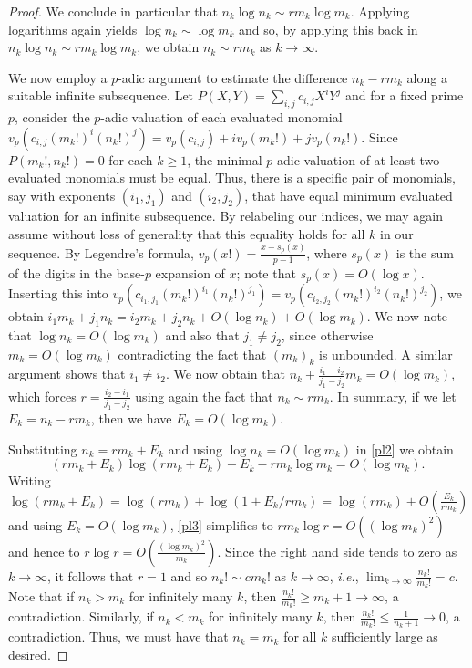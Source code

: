 \documentclass[11pt,reqno]{amsart}
\theoremstyle{definition}
\numberwithin{equation}{section}
\begin{document}
\begin{proof}
We conclude in particular that $n_k \log n_k \sim r m_k \log m_k$. Applying logarithms again yields $\log n_k \sim \log m_k$ and so, by applying this back in $n_k \log n_k \sim r m_k \log m_k$, we obtain  $n_k \sim r m_k$ as $k \to \infty$.     

We now employ a $p$-adic argument to estimate the difference $n_k - r m_k$ along a suitable infinite subsequence. 
Let $P(X, Y)=\sum_{i, j} c_{i, j} X^i Y^j$ and for a fixed prime $p$, consider the $p$-adic valuation of each evaluated monomial $v_p(c_{i, j} (m_k!)^{i} (n_k!)^{j}) = v_p(c_{i, j})+i v_p(m_k!)+ j v_p(n_k!)$. 
Since $P(m_k!, n_k!)=0$ for each $k \geqslant 1$, the minimal $p$-adic valuation of at least two evaluated monomials must be equal. Thus, there is a specific pair of monomials, say with exponents $(i_1, j_1)$ and $(i_2, j_2)$, that have equal minimum evaluated valuation for an infinite subsequence. By relabeling our indices, we may again assume without loss of generality that this equality holds for all $k$ in our sequence.  By Legendre's formula, $v_p(x!)=\frac{x-s_p(x)}{p-1}$, where $s_p(x)$ is the sum of the digits in the base-$p$ expansion of $x$;  note that $s_p(x)=O(\log x)$. Inserting this into 
$v_p(c_{i_1, j_1} (m_k!)^{i_1} (n_k!)^{j_1}) 
= v_p(c_{i_2, j_2} (m_k!)^{i_2} (n_k!)^{j_2})$,  we obtain $i_1 m_k+j_1 n_k =i_2 m_k+j_2 n_k+O(\log n_k)+O(\log m_k)$. We now note that $\log n_k = O(\log m_k)$ and also that $j_1 \neq j_2$,  since otherwise $m_k=O(\log m_k)$ contradicting the fact that $(m_k)_k$ is unbounded.  A similar argument shows that $i_1 \neq i_2$. We now obtain that $n_k+ \frac{i_1-i_2}{j_1-j_2} m_k= O(\log m_k)$, which forces $r= \frac{i_2-i_1}{j_1-j_2}$ using again the fact that $n_k \sim r m_k$.  
In summary, if we let $E_k = n_k -r m_k$, then we have $E_k = O(\log m_k)$. 


Substituting $n_k=rm_k+E_k$ and using $\log n_k=O(\log m_k)$ in \eqref{pl2} we obtain 
\begin{equation} \label{pl3}
(rm_k+E_k) \log(rm_k+E_k)-E_k - rm_k \log m_k = O(\log m_k). 
\end{equation}
Writing $\log(rm_k+E_k)= \log(rm_k)+ \log(1+ E_k/r m_k)= \log (rm_k)+O \left( \frac{E_k}{r m_k} \right)$ and using $E_k = O(\log m_k)$,  \eqref{pl3} simplifies to $r m_k \log r= O((\log m_k)^2)$ and hence to  
$\displaystyle{
r \log r= O \left( \frac{(\log m_k)^2}{m_k} \right).}$  Since the right hand side tends to zero as $k \to \infty$, it follows that $r=1$ and so $n_k! \sim c m_k!$ as $k \to \infty$,  \textit{i.e.},  $\lim_{k \to \infty} \frac{n_k!}{m_k!}=c$. Note that if $n_k> m_k$ for infinitely many $k$, then $\frac{n_k!}{m_k!} \geqslant m_k+1 \to \infty$, a contradiction. Similarly, if $n_k < m_k$ for infinitely many $k$, then $\frac{n_k!}{m_k!} \leqslant \frac{1}{n_k+1} \to 0$, a contradiction. 
Thus, we must have that $n_k=m_k$ for all $k$ sufficiently large as desired. 
\end{proof}
\end{document}
